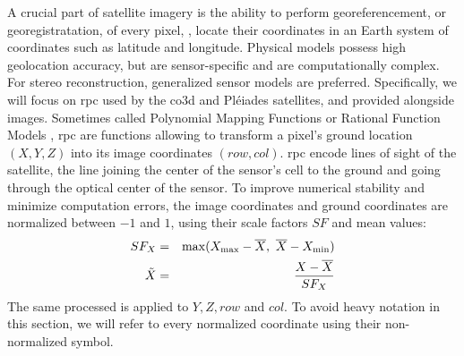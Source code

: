 A crucial part of satellite imagery is the ability to perform georeferencement, or georegistratation, of every pixel, \ie, locate their coordinates in an Earth system of coordinates such as latitude and longitude. Physical models possess high geolocation accuracy, but are sensor-specific and are computationally complex. For stereo reconstruction,  generalized sensor models are preferred. Specifically, we will focus on \acrfull{rpc} \cite{grodecki_ikonos_2001} used by the \acrshort{co3d} and Pléiades satellites, and provided alongside images. Sometimes called Polynomial Mapping Functions \cite{baltsavias_metric_1992} or Rational Function Models \cite{tao_comprehensive_2001}, \acrshort{rpc} are functions allowing to transform a pixel's ground location $(X,Y,Z)$ into its image coordinates $(row, col)$. \acrshort{rpc} encode lines of sight of the satellite, \ie the line joining the center of the sensor's cell to the ground and going through the optical center of the sensor. To improve numerical stability and minimize computation errors, the image coordinates and ground coordinates are normalized between $-1$ and $1$, using their scale factors $SF$ and mean values:
\begin{eqnarray*}
    SF_X &=& \max(X_\mathrm{max}-\overline{X},~\overline{X}-X_\mathrm{min})\\
    \Tilde{X}&=&\frac{X-\overline{X}}{SF_X}
\end{eqnarray*}
The same processed is applied to $Y,Z,row$ and $col$. To avoid heavy notation in this section, we will refer to every normalized coordinate using their non-normalized symbol.

